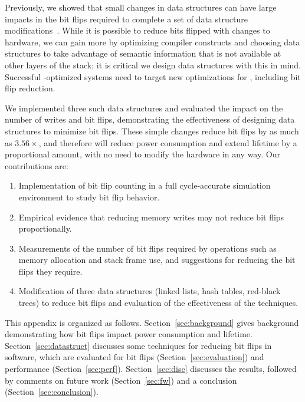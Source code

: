 Previously, we showed that small changes in data
structures can have large impacts in the bit flips required to
complete a set of data structure modifications~\cite{bittman:nvmsa18}.
While it is possible to
reduce bits flipped with changes to hardware, we can gain more
by optimizing compiler constructs and choosing data structures to take advantage
of semantic information that is not available at other layers of the stack;
it is critical we design data structures with this in mind. Successful \NVM-optimized
systems need to target new optimizations for \NVM, including bit flip reduction.

We implemented three such
data structures and evaluated the impact on the number of writes and bit flips,
demonstrating the effectiveness of designing data structures to minimize bit
flips.
These simple changes reduce bit flips by as much as $3.56\times$, and therefore will reduce power
consumption and extend lifetime by a proportional amount,
with no need to modify the hardware in any way.
Our contributions are:
\begin{enumerate}
	\item Implementation of bit flip counting in a full cycle-accurate simulation
	      environment to study bit
	      flip behavior.%
	\item Empirical evidence that reducing memory writes may not reduce bit flips
	      proportionally.
	\item Measurements of the number of bit flips required by operations such as
	      memory allocation and stack frame use, and suggestions for reducing the
	      bit flips they require.
	\item Modification of three data structures (linked lists, hash tables, red-black
	      trees) to reduce bit flips and evaluation of the effectiveness of the techniques.
\end{enumerate}

This appendix is organized as follows. Section~\ref{sec:background} gives
background demonstrating how bit flips impact power consumption and
\NVM lifetime. Section~\ref{sec:datastruct} discusses some techniques for
reducing bit flips in software, which are evaluated for bit flips
(Section~\ref{sec:evaluation}) and performance (Section~\ref{sec:perf}).
Section~\ref{sec:disc} discusses the results, followed by comments on
future work (Section~\ref{sec:fw}) and a conclusion
(Section~\ref{sec:conclusion}).

